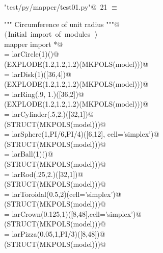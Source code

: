 \documentclass[11pt,oneside]{article}	%
\begin{document}
\begin{flushleft} \small \label{scrap40}
\protect{}\verb@"test/py/mapper/test01.py"@\nobreak\ {\footnotesize 21 }$\equiv$
\vspace{-1ex}
\begin{list}{}{} \item
\mbox{}\verb@""" Circumference of unit radius """@\\
\mbox{}\verb@@\hbox{$\langle\,$Initial import of modules\nobreak\ {\footnotesize {}}$\,\rangle$}\verb@@\\
\mbox{}\verb@from mapper import *@\\
\mbox{}\verb@model = larCircle(1)()@\\
\mbox{}\verb@VIEW(EXPLODE(1.2,1.2,1.2)(MKPOLS(model)))@\\
\mbox{}\verb@model = larDisk(1)([36,4])@\\
\mbox{}\verb@VIEW(EXPLODE(1.2,1.2,1.2)(MKPOLS(model)))@\\
\mbox{}\verb@model = larRing(.9, 1.)([36,2])@\\
\mbox{}\verb@VIEW(EXPLODE(1.2,1.2,1.2)(MKPOLS(model)))@\\
\mbox{}\verb@model = larCylinder(.5,2.)([32,1])@\\
\mbox{}\verb@VIEW(STRUCT(MKPOLS(model)))@\\
\mbox{}\verb@model = larSphere(1,PI/6,PI/4)([6,12], cell='simplex')@\\
\mbox{}\verb@VIEW(STRUCT(MKPOLS(model)))@\\
\mbox{}\verb@model = larBall(1)()@\\
\mbox{}\verb@VIEW(STRUCT(MKPOLS(model)))@\\
\mbox{}\verb@model = larRod(.25,2.)([32,1])@\\
\mbox{}\verb@VIEW(STRUCT(MKPOLS(model)))@\\
\mbox{}\verb@model = larToroidal(0.5,2)(cell='simplex')@\\
\mbox{}\verb@VIEW(STRUCT(MKPOLS(model)))@\\
\mbox{}\verb@model = larCrown(0.125,1)([8,48],cell='simplex')@\\
\mbox{}\verb@VIEW(STRUCT(MKPOLS(model)))@\\
\mbox{}\verb@model = larPizza(0.05,1,PI/3)([8,48])@\\
\mbox{}\verb@VIEW(STRUCT(MKPOLS(model)))@\\

\end{list}
\end{flushleft}
\end{document}
